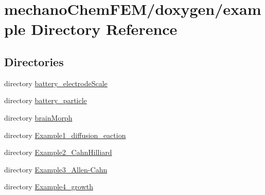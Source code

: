 \section{mechano\-Chem\-F\-E\-M/doxygen/example Directory Reference}
\label{dir_f479854301208d69f1596e8aab2cb7d5}
\subsection*{Directories}
\begin{DoxyCompactItemize}
\item 
directory \hyperlink{dir_5432c63fe6f04dcd244a0048daab7e41}{battery\-\_\-electrode\-Scale}
\item 
directory \hyperlink{dir_f5782c6066440fe39829c0e06f940fb3}{battery\-\_\-particle}
\item 
directory \hyperlink{dir_177cb805c9f4e8a749c682bac9a90b34}{brain\-Morph}
\item 
directory \hyperlink{dir_f4be6f7453f67daf00c127cd2ee588d2}{Example1\-\_\-diffusion\-\_\-eaction}
\item 
directory \hyperlink{dir_2282f6451eb4d368a47aa60ae08e65e0}{Example2\-\_\-\-Cahn\-Hilliard}
\item 
directory \hyperlink{dir_9e85432634f69504a3a2566849bf36bb}{Example3\-\_\-\-Allen-\/\-Cahn}
\item 
directory \hyperlink{dir_9eb9d4c798ee2b79213838e4b997875b}{Example4\-\_\-growth}
\end{DoxyCompactItemize}
